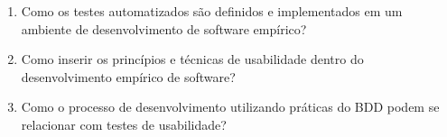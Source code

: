 \begin{enumerate}
\item Como os testes automatizados são definidos e implementados em um ambiente de desenvolvimento de software empírico?
\item Como inserir os princípios e técnicas de usabilidade dentro do desenvolvimento empírico de software?
\item Como o processo de desenvolvimento utilizando práticas do BDD podem se relacionar com testes de usabilidade?
\end{enumerate}

\begin{comment}
A partir das questões de pesquisa, foram definidas questões especificas e para cada questão, foram definidas métricas:

\begin{enumerate}
\item \textbf{Questão 01: }Qual a estimativa de esforço gasto com testes?

	\textbf{Métrica: } Pontos de história / horas gastas com testes por sprint.

\item \textbf{Questão 02: }Qual a cobertura de testes de aceitação apresentada?

	\textbf{Métrica: } Porcentagem de cobertura de testes.

\item \textbf{Questão 03: }Qual a viabilidade da adoção de práticas de usabilidade em conjunto com as metodologias ágeis utilizadas no projeto?

	Observar a integração das atividades ao longo do ciclo de vida do projeto e realizar entrevista com os participantes sobre as principais dificuldades encontradas na integração das duas metodologias.
\item \textbf{Questão 04: }Qual a conformidade do sistema com as heurísticas de usabilidade?

	\textbf{Métrica: }
\item \textbf{Questão 05: }Qual a capacidade do sistema de atrair o usuário?
	
	\textbf{Métrica: }
\item \textbf{Questão 06:} Qual a capacidade do sistema de possibilitar ao usuário aprender a manuseá-lo?

	\textbf{Métrica: }
\end{enumerate}
\end{comment}

